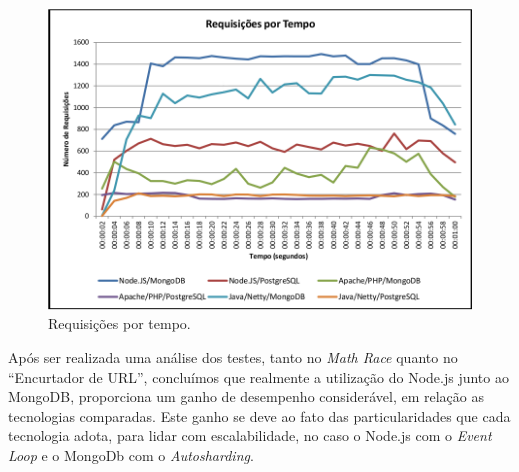 \begin{description}
\begin{figure}[htb]
\includegraphics[scale=0.5]{images/graf_req_tempo.png}
\caption{Requisições por tempo. \cite{NodejsEMongodb}}
\label{fig:graf_tempo}
\end{figure}

\end{description}


Após ser realizada uma análise dos testes, tanto no \textit{Math Race} quanto no ``Encurtador de URL'', concluímos que realmente a utilização do Node.js junto ao MongoDB, proporciona um ganho de desempenho considerável, em relação as tecnologias comparadas. Este ganho se deve ao fato das particularidades que cada tecnologia adota, para lidar com escalabilidade, no caso o Node.js com o \textit{Event Loop} e o MongoDb com o \textit{Autosharding}.











